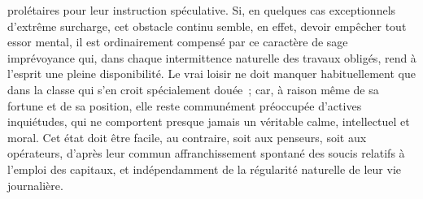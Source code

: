 \documentclass[french,twoside]{book} %
\begin{document}
prolétaires pour leur instruction spéculative. Si, en quelques cas exceptionnels d’extrême surcharge, cet obstacle continu semble, en effet, devoir empêcher tout essor mental, il est ordinairement compensé par ce caractère de sage imprévoyance qui, dans chaque intermittence naturelle des travaux obligés, rend à l’esprit une pleine disponibilité. Le vrai loisir ne doit manquer habituellement que dans la classe qui s’en croit spécialement douée ; car, à raison même de sa fortune et de sa position, elle reste communément préoccupée d’actives inquiétudes, qui ne comportent presque jamais un véritable calme, intellectuel et moral. Cet état doit être facile, au contraire, soit aux penseurs, soit aux opérateurs, d’après leur commun affranchissement spontané des soucis relatifs à l’emploi des capitaux, et indépendamment de la régularité naturelle de leur vie journalière.\par
\end{document}
